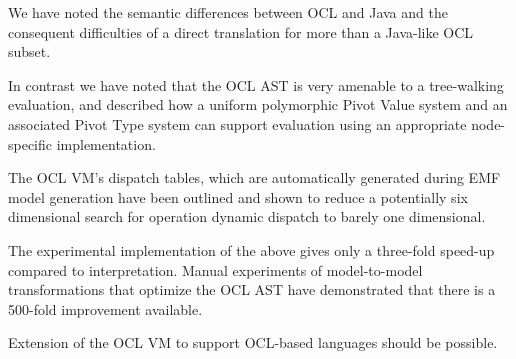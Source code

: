 \documentclass{acm_proc_article-sp}
\begin{document}
We have noted the semantic differences between OCL and Java and the consequent difficulties of a direct
translation for more than a Java-like OCL subset.

In contrast we have noted that the OCL AST is very amenable to a tree-walking evaluation, and described how
a uniform polymorphic Pivot Value system and an associated Pivot Type system can support evaluation using
an appropriate node-specific implementation.

The OCL VM's dispatch tables, which are automatically generated during EMF model generation
have been outlined and shown to reduce a potentially six dimensional search for operation
dynamic dispatch to barely one dimensional.

The experimental implementation of the above gives only a three-fold speed-up compared to interpretation. Manual
experiments of model-to-model transformations that optimize the OCL AST have demonstrated that there is a 
500-fold improvement available.

Extension of the OCL VM to support OCL-based languages should be possible.

%


%
%
\balancecolumns
\end{document}

